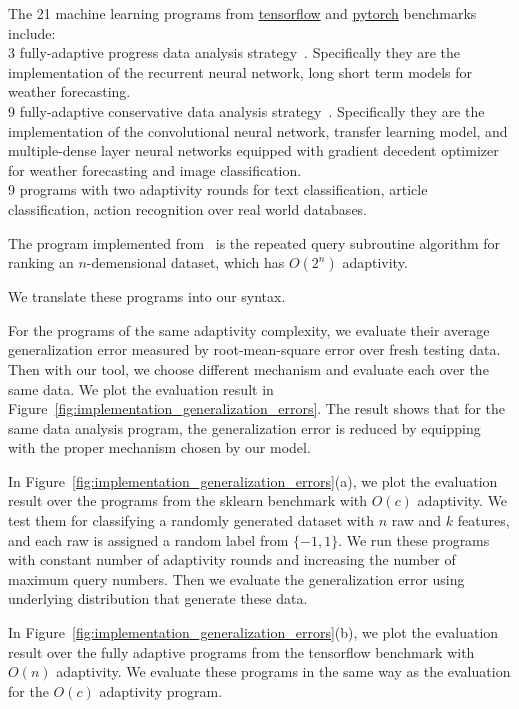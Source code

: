 The 21 machine learning programs
from \hyperlink{https://github.com/tensorflow/tensorflow/tree/master/tensorflow/examples}{tensorflow}
and \hyperlink{https://github.com/pytorch/pytorch}{pytorch}
benchmarks include:
\\
3 fully-adaptive progress data analysis
strategy~\cite{ZrnicH19}.
Specifically they are the implementation of the recurrent neural network, long short term models for 
weather forecasting.
\\
9
fully-adaptive conservative data analysis
strategy~\cite{ZrnicH19}.
Specifically they are the implementation of the convolutional neural network, transfer learning model,
and multiple-dense layer neural networks equipped with gradient decedent optimizer for
weather forecasting and image classification.
\\
9 programs with two adaptivity rounds for text classification,
article classification, action recognition over real world databases.

The program implemented from~\cite{Jamieson2015TheAO} is the repeated query subroutine algorithm for ranking
an $n$-demensional dataset, which
has $O(2^n)$ adaptivity.

We translate these programs into our syntax.

For the programs of the same adaptivity complexity, we evaluate their average generalization error measured by root-mean-square error over fresh testing data.
Then with our tool, we choose different mechanism and evaluate each over the same data.
We plot the evaluation result in Figure~\ref{fig:implementation_generalization_errors}.
The result shows that for the same data analysis program, the generalization error is reduced
by equipping with the proper mechanism chosen by our model.

In Figure~\ref{fig:implementation_generalization_errors}(a), we plot the evaluation result over the
programs from the sklearn benchmark with $O(c)$ adaptivity.
We test them for classifying a randomly generated dataset with $n$ raw and $k$ features, and each raw is
assigned a random label from $\{-1, 1\}$.
We run these programs with constant number of adaptivity rounds and increasing the number of
maximum query numbers.
Then we evaluate the generalization error using underlying distribution that generate these data.

In Figure~\ref{fig:implementation_generalization_errors}(b), we plot the 
evaluation result over the fully adaptive
programs from the tensorflow benchmark with $O(n)$ adaptivity.
We evaluate these programs in the same way as the evaluation for the $O(c)$ adaptivity program.

